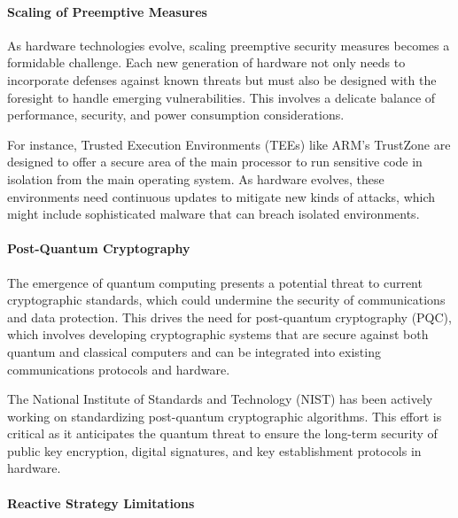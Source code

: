 \hypertarget{scaling-of-preemptive-measures}{%
\paragraph{Scaling of Preemptive
Measures}\label{scaling-of-preemptive-measures}}

As hardware technologies evolve, scaling preemptive security measures becomes a formidable challenge. Each new generation of hardware not only needs to incorporate defenses against known threats but must also be designed with the foresight to handle emerging vulnerabilities. This involves a delicate balance of performance, security, and power consumption considerations.

For instance, Trusted Execution Environments (TEEs) like ARM's TrustZone are designed to offer a secure area of the main processor to run sensitive code in isolation from the main operating system. As hardware evolves, these environments need continuous updates to mitigate new kinds of attacks, which might include sophisticated malware that can breach isolated environments.\cite{ngabonzizaTrustZoneExplainedArchitectural2016}

\hypertarget{post-quantum-cryptography}{%
\paragraph{Post-Quantum Cryptography}\label{post-quantum-cryptography}}

The emergence of quantum computing presents a potential threat to current cryptographic standards, which could undermine the security of communications and data protection. This drives the need for post-quantum cryptography (PQC), which involves developing cryptographic systems that are secure against both quantum and classical computers and can be integrated into existing communications protocols and hardware.

The National Institute of Standards and Technology (NIST) has been actively working on standardizing post-quantum cryptographic algorithms. This effort is critical as it anticipates the quantum threat to ensure the long-term security of public key encryption, digital signatures, and key establishment protocols in hardware.\cite{computersecuritydivisionPostQuantumCryptographyCSRC2017}

\hypertarget{reactive-strategy-limitations}{%
\paragraph{Reactive Strategy
Limitations}\label{reactive-strategy-limitations}}

